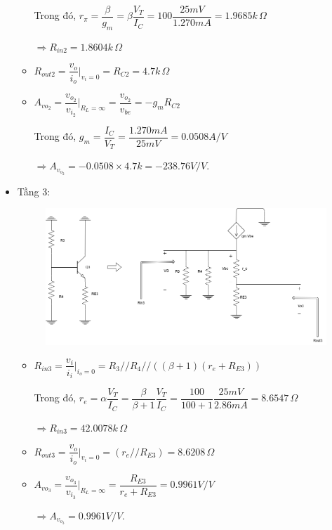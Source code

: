\begin{itemize}[label=-]
\begin{itemize}[label = +]
		Trong đó, $r_{\pi} = \dfrac{\beta}{g_{m}} = \beta \dfrac{V_{T}}{I_{C}} = 100 \dfrac{25mV}{1.270mA} = 1.9685k\,\Omega$
		
		$\Rightarrow R_{in2} = 1.8604k\,\Omega$
		\item $R_{out2} = \dfrac{v_{o}}{i_{o}}|_{v_{i} = 0} = R_{C2} = 4.7k \,\Omega$
		\item $A_{vo_{2}} = \dfrac{v_{o_{2}}}{v_{i_{2}}}|_{R_{L} = \infty} = \dfrac{v_{o_{2}}}{v_{be}} = -g_{m}R_{C2}$
		
		Trong đó, $g_{m} = \dfrac{I_{C}}{V_{T}} = \dfrac{1.270mA}{25mV} = 0.0508 A/V$
		
		$\Rightarrow A_{v_{o_{2}}} = -0.0508\times 4.7k = -238.76 V/V$.
	\end{itemize}
	
	\item Tầng 3:
	
	\begin{figure}[H]
		\centering
		\includegraphics[width=.7\linewidth]{./my-chapters/my-diagrams/Question6/caub_stage3.png}
	\end{figure}
	
	\begin{itemize}[label = +]
		\item $R_{in3} = \dfrac{v_{i}}{i_{i}}|_{i_{o}=0} = R_{3} // R_{4} // ((\beta + 1)(r_{e} + R_{E3}))$
		
		Trong đó, $r_{e} = \alpha\dfrac{V_{T}}{I_{C}} = \dfrac{\beta}{\beta + 1}\dfrac{V_{T}}{I_{C}} = \dfrac{100}{100+1} \dfrac{25mV}{2.86mA} = 8.6547\,\Omega$
		
		$\Rightarrow R_{in3} = 42.0078k\,\Omega$
		\item $R_{out3} = \dfrac{v_{o}}{i_{o}}|_{v_{i} = 0} = (r_{e} // R_{E3}) = 8.6208\,\Omega$
		\item $A_{vo_{3}} = \dfrac{v_{o_{3}}}{v_{i_{3}}}|_{R_{L} = \infty} = \dfrac{R_{E3}}{r_{e} + R_{E3}} = 0.9961 V/V$
		
		$\Rightarrow A_{v_{o_{3}}} = 0.9961 V/V$.
	\end{itemize}
\end{itemize}

